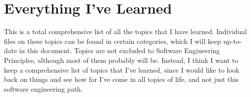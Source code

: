 \documentclass{article}
\begin{document}
\section*{Everything I've Learned}
This is a total comprehensive list of all the topics that I have learned. Individual files on these topics can be found in certain categories, which I will keep up-to-date in this document. Topics are not excluded to Software Engineering Principles, although most of them probably will be. Instead, I think I want to keep a comprehensive list of topics that I've learned, since I would like to look back on things and see how far I've come in all topics of life, and not just this software engineering path.
\end{document}
